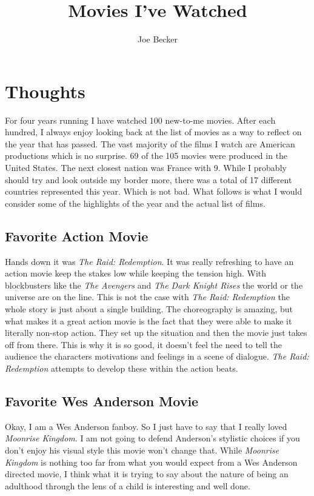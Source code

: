 \documentclass[11pt]{article}
\begin{document}
\title{Movies I've Watched}
\author{Joe Becker}
\maketitle
\section{Thoughts}
For four years running I have watched 100 new-to-me movies. After each hundred, I always enjoy looking back at the list of movies as a way to reflect on the year that has passed. The vast majority of the films I watch are American productions which is no surprise. 69 of the 105 movies were produced in the United States. The next closest nation was France with 9. While I probably should try and look outside my border more, there was a total of 17 different countries represented this year. Which is not bad. What follows is what I would consider some of the highlights of the year and the actual list of films.

\subsection{Favorite Action Movie}
Hands down it was \emph{The Raid: Redemption}. It was really refreshing to have an action movie keep the stakes low while keeping the tension high. With blockbusters like the \emph{The Avengers} and \emph{The Dark Knight Rises} the world or the universe are on the line. This is not the case with \emph{The Raid: Redemption} the whole story is just about a single building. The choreography is amazing, but what makes it a great action movie is the fact that they were able to make it literally non-stop action. They set up the situation and then the movie just takes off from there. This is why it is so good, it doesn't feel the need to tell the audience the characters motivations and feelings in a scene of dialogue. \emph{The Raid: Redemption} attempts to develop these within the action beats.

\subsection{Favorite Wes Anderson Movie}
Okay, I am a Wes Anderson fanboy. So I just have to say that I really loved \emph{Moonrise Kingdom}. I am not going to defend Anderson's stylistic choices if you don't enjoy his visual style this movie won't change that. While \emph{Moonrise Kingdom} is nothing too far from what you would expect from a Wes Anderson directed movie, I think what it is trying to say about the nature of being an adulthood through the lens of a child is interesting and well done.
\end{document}
